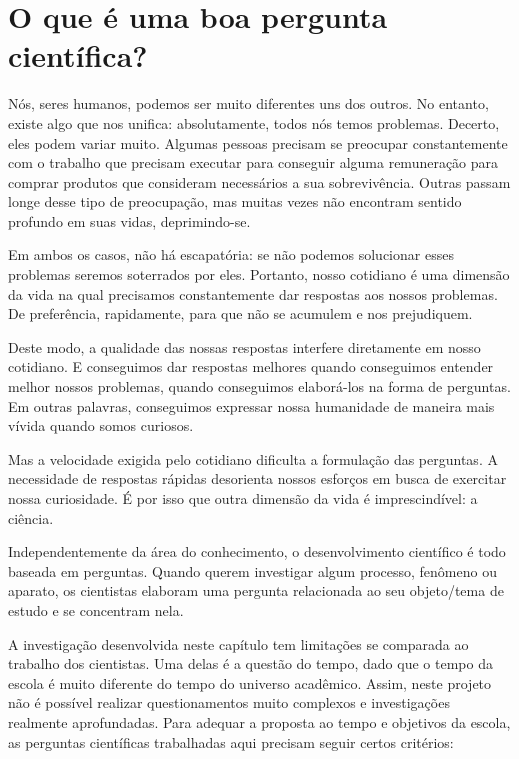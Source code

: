 \label{etapa2}
\label{pergunta-cientifica}
\vspace{-.5\baselineskip}
\section{O que é uma boa pergunta científica?}

Nós, seres humanos, podemos ser muito diferentes uns dos outros. No entanto, existe algo que nos unifica: absolutamente, todos nós temos problemas. Decerto, eles podem variar muito. Algumas pessoas precisam se preocupar constantemente com o trabalho que precisam executar para conseguir alguma remuneração para comprar produtos que consideram necessários a sua sobrevivência. Outras passam longe desse tipo de preocupação, mas muitas vezes não encontram sentido profundo em suas vidas, deprimindo-se.

Em ambos os casos, não há escapatória: se não podemos solucionar esses problemas seremos soterrados por eles. Portanto, nosso cotidiano é uma dimensão da vida na qual precisamos constantemente dar respostas aos nossos problemas. De preferência, rapidamente, para que não se acumulem e nos prejudiquem.

Deste modo, a qualidade das nossas respostas interfere diretamente em nosso cotidiano. E conseguimos dar respostas melhores quando conseguimos entender melhor nossos problemas, quando conseguimos elaborá-los na forma de perguntas. Em outras palavras, conseguimos expressar nossa humanidade de maneira mais vívida quando somos curiosos.  

Mas a velocidade exigida pelo cotidiano dificulta a formulação das perguntas. A necessidade de respostas rápidas desorienta nossos esforços em busca de exercitar nossa curiosidade. É por isso que outra dimensão da vida é imprescindível: a ciência.

Independentemente da área do conhecimento, o desenvolvimento científico é todo baseada em perguntas. Quando querem investigar algum processo, fenômeno ou aparato, os cientistas elaboram uma pergunta relacionada ao seu objeto/tema de estudo e se concentram nela. 

A investigação desenvolvida neste capítulo tem limitações se comparada ao trabalho dos cientistas. Uma delas é a questão do tempo, dado que o tempo da escola é muito diferente do tempo do universo acadêmico. Assim, neste projeto não é possível realizar questionamentos muito complexos e investigações realmente aprofundadas. Para adequar a proposta ao tempo e objetivos da escola, as perguntas científicas trabalhadas aqui precisam seguir certos critérios:

